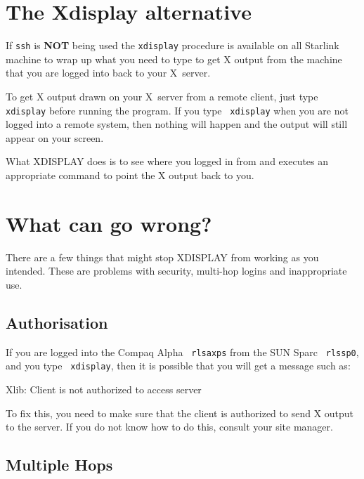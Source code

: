 \documentclass[twoside,11pt,nolof,noabs]{starlink}
\begin{document}
\section{\label{solution}The Xdisplay alternative}

If \texttt{ssh} is \textbf{NOT} being used the \texttt{xdisplay} procedure
is available on all Starlink machine to wrap up what you need to type
to get X output from the machine that you are logged into back to your
X~server.

To get X output drawn on your X~server from a remote client, just type
\texttt{ xdisplay} before running the program.  If you type \texttt{ xdisplay}
when you are not logged into a remote system, then nothing will happen
and the output will still appear on your screen.

What XDISPLAY does is to see where you logged in from and executes an
appropriate command to point the X output back to you.

\section{\label{wrong}What can go wrong?}

There are a few things that might stop XDISPLAY from working as you intended.
These are problems with security, multi-hop logins and inappropriate use.

\subsection{\label{security}Authorisation}

If you are logged into the Compaq Alpha \texttt{ rlsaxps} from the
SUN Sparc \texttt{ rlssp0}, and you type \texttt{ xdisplay}, then it is possible
that you will get a message such as:

\begin{terminalv}
Xlib:  Client is not authorized to access server
\end{terminalv}

To fix this, you need to make sure that the client is authorized to send X
output to the server.  If you do not know how to do this, consult your site
manager.

\subsection{\label{multihop}Multiple Hops}
\end{document}
